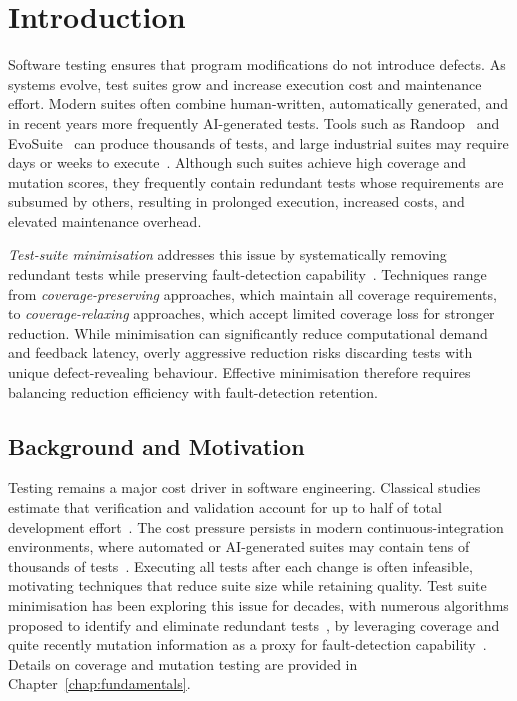 \chapter{Introduction}

Software testing ensures that program modifications do not introduce defects. As systems evolve, test suites grow and increase execution cost and maintenance effort. Modern suites often combine human-written, automatically generated, and in recent years more frequently AI-generated tests. Tools such as Randoop~\cite{pacheco2007} and EvoSuite~\cite{fraser2011} can produce thousands of tests, and large industrial suites may require days or weeks to execute~\cite{rothermel1998}. Although such suites achieve high coverage and mutation scores, they frequently contain redundant tests whose requirements are subsumed by others, resulting in prolonged execution, increased costs, and elevated maintenance overhead.

\emph{Test-suite minimisation} addresses this issue by systematically removing redundant tests while preserving fault-detection capability~\cite{yoo2012}. Techniques range from \emph{coverage-preserving} approaches, which maintain all coverage requirements, to \emph{coverage-relaxing} approaches, which accept limited coverage loss for stronger reduction. While minimisation can significantly reduce computational demand and feedback latency, overly aggressive reduction risks discarding tests with unique defect-revealing behaviour. Effective minimisation therefore requires balancing reduction efficiency with fault-detection retention.

\section{Background and Motivation}

Testing remains a major cost driver in software engineering. Classical studies estimate that verification and validation account for up to half of total development effort~\cite{boehm1984}. The cost pressure persists in modern continuous-integration environments, where automated or AI-generated suites may contain tens of thousands of tests~\cite{rothermel1998,bach2017}. Executing all tests after each change is often infeasible, motivating techniques that reduce suite size while retaining quality. Test suite minimisation has been exploring this issue for decades, with numerous algorithms proposed to identify and eliminate redundant tests~\cite{yoo2012}, by leveraging coverage and quite recently mutation information as a proxy for fault-detection capability~\cite{jehan2023}. Details on coverage and mutation testing are provided in Chapter~\ref{chap:fundamentals}. 



